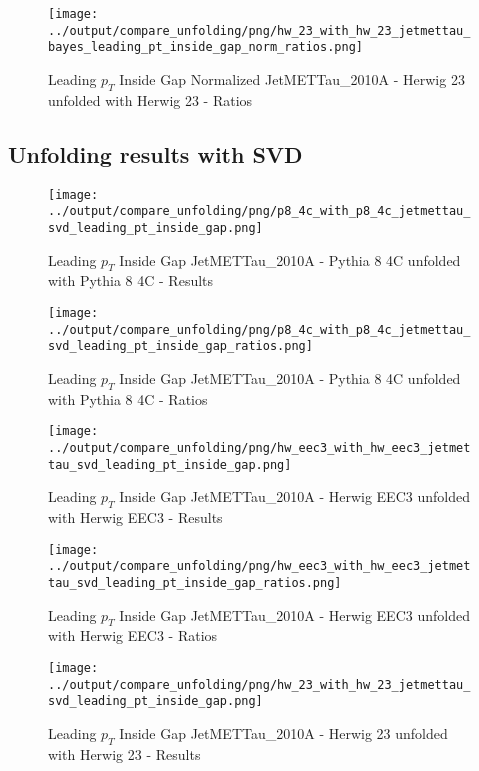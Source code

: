\documentclass[11pt]{book}
\begin{document}
\begin{figure}[ht]
\centering
\texttt{[image: ../output/compare\_unfolding/png/hw\_23\_with\_hw\_23\_jetmettau\_bayes\_leading\_pt\_inside\_gap\_norm\_ratios.png]}
\caption{Leading $p_{T}$ Inside Gap Normalized JetMETTau\_2010A - Herwig 23 unfolded with Herwig 23 - Ratios}
\label{hw_23_hw_23_jetmettau_bayes_leading_pt_inside_gap_norm_b}
\end{figure}



\clearpage
\subsection{Unfolding results with SVD}

\begin{figure}[ht]
\centering
\texttt{[image: ../output/compare\_unfolding/png/p8\_4c\_with\_p8\_4c\_jetmettau\_svd\_leading\_pt\_inside\_gap.png]}
\caption{Leading $p_{T}$ Inside Gap JetMETTau\_2010A - Pythia 8 4C unfolded with Pythia 8 4C - Results}
\label{p8_p8_jetmettau_svd_leading_pt_inside_gap_a}
\end{figure}

\begin{figure}[ht]
\centering
\texttt{[image: ../output/compare\_unfolding/png/p8\_4c\_with\_p8\_4c\_jetmettau\_svd\_leading\_pt\_inside\_gap\_ratios.png]}
\caption{Leading $p_{T}$ Inside Gap JetMETTau\_2010A - Pythia 8 4C unfolded with Pythia 8 4C - Ratios}
\label{p8_p8_jetmettau_svd_leading_pt_inside_gap_b}
\end{figure}

\begin{figure}[ht]
\centering
\texttt{[image: ../output/compare\_unfolding/png/hw\_eec3\_with\_hw\_eec3\_jetmettau\_svd\_leading\_pt\_inside\_gap.png]}
\caption{Leading $p_{T}$ Inside Gap JetMETTau\_2010A - Herwig EEC3 unfolded with Herwig EEC3 - Results}
\label{hw_eec3_hw_eec3_jetmettau_svd_leading_pt_inside_gap_a}
\end{figure}

\begin{figure}[ht]
\centering
\texttt{[image: ../output/compare\_unfolding/png/hw\_eec3\_with\_hw\_eec3\_jetmettau\_svd\_leading\_pt\_inside\_gap\_ratios.png]}
\caption{Leading $p_{T}$ Inside Gap JetMETTau\_2010A - Herwig EEC3 unfolded with Herwig EEC3 - Ratios}
\label{hw_eec3_hw_eec3_jetmettau_svd_leading_pt_inside_gap_b}
\end{figure}

\begin{figure}[ht]
\centering
\texttt{[image: ../output/compare\_unfolding/png/hw\_23\_with\_hw\_23\_jetmettau\_svd\_leading\_pt\_inside\_gap.png]}
\caption{Leading $p_{T}$ Inside Gap JetMETTau\_2010A - Herwig 23 unfolded with Herwig 23 - Results}
\label{hw_23_hw_23_jetmettau_svd_leading_pt_inside_gap_a}
\end{figure}
\end{document}
